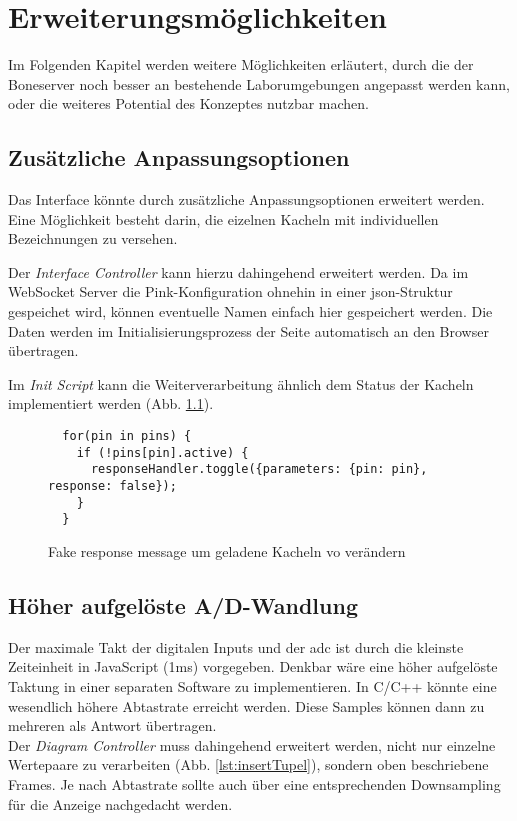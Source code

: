 \chapter{Erweiterungsmöglichkeiten}
Im Folgenden Kapitel werden weitere Möglichkeiten erläutert, durch die der Boneserver noch besser an bestehende Laborumgebungen angepasst werden kann, oder die weiteres Potential des Konzeptes nutzbar machen.

\section{Zusätzliche Anpassungsoptionen}
Das Interface könnte durch zusätzliche Anpassungsoptionen erweitert werden. Eine Möglichkeit besteht darin, die eizelnen Kacheln mit individuellen Bezeichnungen zu versehen.

Der \textit{Interface Controller} kann hierzu dahingehend erweitert werden. Da im WebSocket Server die Pink-Konfiguration ohnehin in einer \gls{json}-Struktur gespeichet wird, können eventuelle Namen einfach hier gespeichert werden. Die Daten werden im Initialisierungsprozess der Seite automatisch an den Browser übertragen.

Im \textit{Init Script} kann die Weiterverarbeitung ähnlich dem Status der Kacheln implementiert werden (Abb. \ref{lst:fakeResponseMessage}).

\begin{figure}[H]
  \begin{lstlisting}
  for(pin in pins) {
    if (!pins[pin].active) {
      responseHandler.toggle({parameters: {pin: pin}, response: false});
    }
  }
  \end{lstlisting}
  \caption{Fake response message um geladene Kacheln vo verändern}
  \label{lst:fakeResponseMessage}
\end{figure}


\section{Höher aufgelöste A/D-Wandlung}
Der maximale Takt der digitalen Inputs und der \gls{adc} ist durch die kleinste Zeiteinheit in JavaScript (1ms) vorgegeben. Denkbar wäre eine höher aufgelöste Taktung in einer separaten Software zu implementieren. In C/C++ könnte eine wesendlich höhere Abtastrate erreicht werden. Diese Samples können dann zu mehreren als Antwort übertragen.\\

Der \textit{Diagram Controller} muss dahingehend erweitert werden, nicht nur einzelne Wertepaare zu verarbeiten (Abb. \ref{lst:insertTupel}), sondern oben beschriebene Frames. Je nach Abtastrate sollte auch über eine entsprechenden Downsampling für die Anzeige nachgedacht werden.

